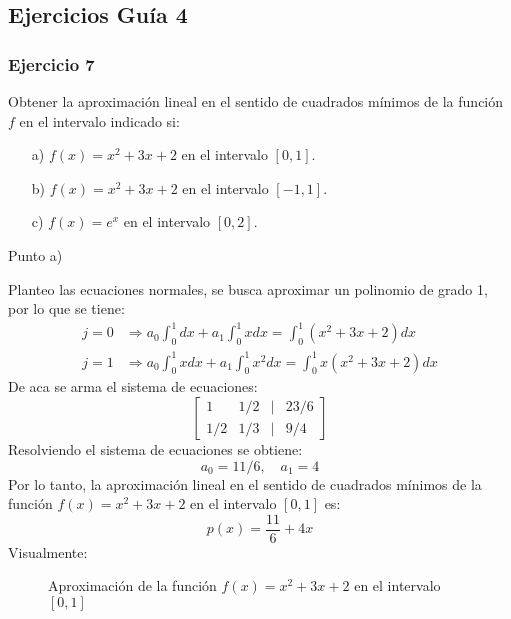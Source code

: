 \documentclass{article}
\begin{document}
\subsection{Ejercicios Guía 4}
\subsubsection{Ejercicio 7}
Obtener la aproximación lineal en el sentido de cuadrados mínimos de la función $f$ en el intervalo indicado si:
\begin{itemize}
    \item[a) ] $f(x) = x^2 + 3x + 2$ en el intervalo $[0,1]$.
    \item[b) ] $f(x) = x^2 + 3x + 2$ en el intervalo $[-1,1]$.
    \item[c) ] $f(x) = e^x$ en el intervalo $[0,2]$.   
\end{itemize}

\begin{center}
    Punto a) \\
\end{center}

Planteo las ecuaciones normales, se busca aproximar un polinomio de grado 1, por lo que se tiene:
\begin{align}
    j = 0 &\Rightarrow a_0 \int_{0}^{1} dx + a_1 \int_{0}^{1} x dx = \int_{0}^{1} (x^2 + 3x + 2) dx \\
    j = 1 &\Rightarrow a_0 \int_{0}^{1} x dx + a_1 \int_{0}^{1} x^2 dx = \int_{0}^{1} x(x^2 + 3x + 2) dx
\end{align}
De aca se arma el sistema de ecuaciones:
\begin{equation}
    \begin{bmatrix}
        1 & 1/2 & | & 23/6 \\
        1/2 & 1/3 & | & 9/4
    \end{bmatrix}
\end{equation}
Resolviendo el sistema de ecuaciones se obtiene:
\begin{equation}
    a_0 = 11/6, \quad a_1 = 4
\end{equation}
Por lo tanto, la aproximación lineal en el sentido de cuadrados mínimos de la función \( f(x) = x^2 + 3x + 2 \) en el intervalo \([0,1]\) es:
\begin{equation}
    p(x) = \frac{11}{6} + 4x
\end{equation}
\newpage
Visualmente:
\begin{figure}[h]
    \centering
    \caption{Aproximación de la función \( f(x) = x^2 + 3x + 2 \) en el intervalo \([0,1]\)}
    \label{fig:myplot9}
\end{figure}
\end{document}
